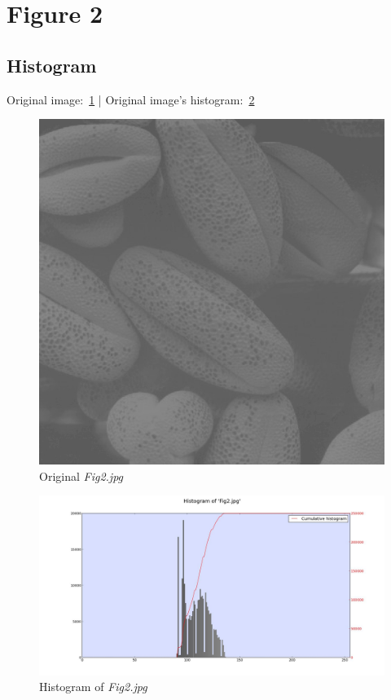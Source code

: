 \section{Figure 2}

    \subsection{Histogram}

    Original image:~\ref{diagram:fig2} |
    Original image's histogram:~\ref{diagram:hist_fig2}

    \begin{figure}[h]
        \centering
        \includegraphics[width=0.7\linewidth]{./images/Fig2.jpg}
        \caption{Original \textit{Fig2.jpg}}
        \label{diagram:fig2}
    \end{figure}

    \begin{figure}[h]
        \centering
        \includegraphics[width=\linewidth]{./images/Histogram_Fig2.jpg}
        \caption{Histogram of \textit{Fig2.jpg}}
        \label{diagram:hist_fig2}
    \end{figure}

